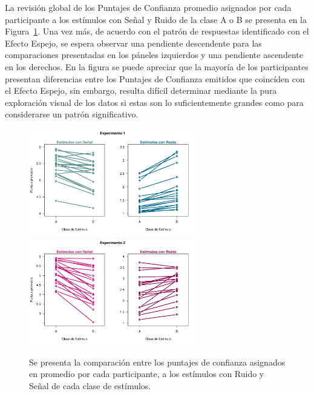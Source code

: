La revisión global de los Puntajes de Confianza promedio asignados por cada participante a los estímulos con Señal y Ruido de la clase A o B se presenta en la Figura~\ref{fig:Diff_Ratings}. Una vez más, de acuerdo con el patrón de respuestas identificado con el Efecto Espejo, se espera observar una pendiente descendente para las comparaciones presentadas en los páneles izquierdos y una pendiente ascendente en los derechos. En la figura se puede apreciar que la mayoría de los participantes presentan diferencias entre los Puntajes de Confianza emitidos que coincíden con el Efecto Espejo, sin embargo, resulta difícil determinar mediante la pura exploración visual de los datos si estas son lo suficientemente grandes como para considerarse un patrón significativo.\\

\begin{figure}[th]
\centering
\includegraphics[width=0.65\textwidth]{Figures/Diff_Rating_E1}\\ 
\includegraphics[width=0.65\textwidth]{Figures/Diff_Rating_E2}\\
\caption[Comparación entre los Puntajes de Confianza asignados a los ensayos con Ruido y Señal de cada clase]{Se presenta la comparación entre los puntajes de confianza asignados en promedio por cada participante, a los estímulos con Ruido y Señal de cada clase de estímulos.}
\label{fig:Diff_Ratings}
\end{figure}

